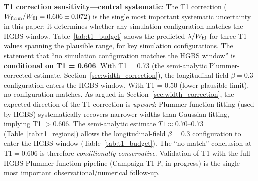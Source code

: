 \documentclass[twoside,twocolumn]{mnras}
\begin{document}
\textbf{T1 correction sensitivity---central systematic}: The T1 correction
($W_{\rm form}/W_{\rm fil} = 0.606 \pm 0.072$) is the single most important systematic
uncertainty in this paper: it determines whether any simulation configuration matches
the HGBS window. Table~\ref{tab:t1_budget} shows the predicted $\lambda/W_{\rm fil}$
for three T1 values spanning the plausible range, for key simulation configurations.
The statement that ``no simulation configuration matches the HGBS window'' is
\textbf{conditional on T1 = 0.606}. With T1 = 0.73 (the semi-analytic Plummer-corrected estimate, Section~\ref{sec:width_correction}), the longitudinal-field $\beta = 0.3$ configuration enters the HGBS window.
With T1 = 0.50 (lower plausible limit), no configuration matches. As argued in Section~\ref{sec:width_correction}, the expected direction of the T1 correction is \textit{upward}: Plummer-function fitting (used by HGBS) systematically recovers narrower widths than Gaussian fitting, implying T1 $> 0.606$. The semi-analytic estimate $T1 \approx 0.70$--$0.73$ (Table~\ref{tab:t1_regions}) allows the longitudinal-field $\beta = 0.3$ configuration to enter the HGBS window (Table~\ref{tab:t1_budget}). The ``no match'' conclusion at T1$=0.606$ is therefore \textit{conditionally conservative}. Validation of T1 with the full HGBS Plummer-function pipeline (Campaign T1-P, in progress) is the single most important observational/numerical follow-up.
\end{document}
